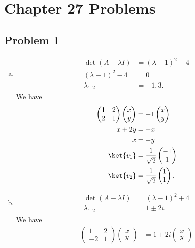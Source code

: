 \documentclass[10pt]{mypackage}
\begin{document}
\section{Chapter 27 Problems}%
\subsection{Problem 1}%
\begin{enumerate}[(a)]
  \item 
    \begin{align*}
      \det\left(A - \lambda I\right) &= \left(\lambda - 1\right)^2 - 4\\
      \left(\lambda - 1\right)^2 - 4 &= 0\\
      \lambda_{1,2} &= -1,3.
    \end{align*}
    We have
    \begin{align*}
      \begin{pmatrix}1 & 2 \\ 2 & 1\end{pmatrix} \begin{pmatrix}x\\y\end{pmatrix} &= -1 \begin{pmatrix}x\\y\end{pmatrix}\\
      x + 2y &= -x\\
      x &= -y\\
      \ket{v_1} &= \frac{1}{\sqrt{2}}\begin{pmatrix}-1\\1\end{pmatrix}\\
      \ket{v_2} &= \frac{1}{\sqrt{2}} \begin{pmatrix}1\\1\end{pmatrix}.
    \end{align*}
  \item 
    \begin{align*}
      \det\left(A - \lambda I\right) &= \left(\lambda - 1\right)^2 + 4\\
      \lambda_{1,2} &= 1\pm 2i.
    \end{align*}
    We have
    \begin{align*}
      \begin{pmatrix}1 & 2 \\ -2 & 1\end{pmatrix} \begin{pmatrix}x\\y\end{pmatrix} &= 1 \pm 2i \begin{pmatrix}x\\y\end{pmatrix}\\

\end{align*}
\end{enumerate}
\end{document}

